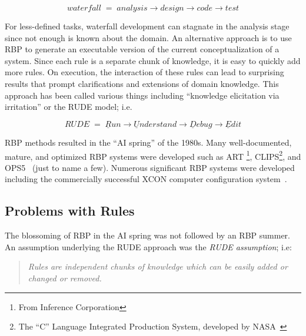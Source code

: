\documentclass[twocolumn,global]{sys/svjour}
\begin{document}
 \[waterfall\;=\;analysis \rightarrow
design \rightarrow code \rightarrow test\]

For less-defined tasks, waterfall development can stagnate in the
analysis stage since not enough is known about the domain. An
alternative approach is to use
 RBP to
generate an executable version of the current conceptualization of a
system.  Since each rule is a separate chunk of knowledge, it is easy
to quickly add more rules. On execution, the interaction of these
rules can lead to surprising results that prompt clarifications and
extensions of domain knowledge. This approach has been called various
things including ``knowledge elicitation via irritation'' or the RUDE
model; i.e.

\[RUDE\;=\;\underline{R}un \rightarrow \underline{U}nderstand
\rightarrow \underline{D}ebug \rightarrow \underline{E}dit\]



RBP methods resulted in the ``AI spring'' of the 1980s. Many
well-documented, mature, and optimized RBP systems were developed
such as ART \footnote{From Inference Corporation}, CLIPS\footnote{The
``C'' Language Integrated Production System, developed by
NASA~\cite{nasa91}}, and OPS5~\cite{brownston92} (just to name a
few). Numerous significant  RBP systems were developed including the
commercially successful XCON computer configuration
system~\cite{mcderm93}.


\subsection{Problems with Rules}



 The blossoming of RBP in the AI spring was not followed by an
RBP  summer. An assumption underlying the RUDE approach was  the {\em
RUDE assumption}; i.e:

\begin{quote}
{\em Rules are independent chunks of knowledge which can be easily
added or changed or removed.} \end{quote}
\end{document}
